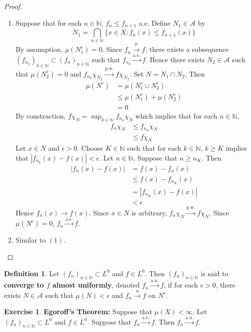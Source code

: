 \documentclass{book}
\theoremstyle{definition}
\newtheorem{defn}[definition]{Definition}
\newtheorem{ex}[definition]{Exercise}
\newcommand{\ep}{\epsilon}
\newcommand{\N}{\mathbb{N}}
\newcommand{\MA}{\mathcal{A}}
\newcommand{\lex}[1]{\label{ex:#1}}
\newcommand{\ld}[1]{\label{defn:#1}}
\DeclareMathOperator*{\0}{\mbf{0}}
\DeclareMathOperator*{\1}{\mbf{1}}
\newcommand{\convt}[1]{\xrightarrow{\text{#1}}}
\newcommand{\conv}[1]{\xrightarrow{#1}}
\begin{document}
	\begin{proof}\
		\begin{enumerate}
			\item Suppose that for each $n \in \N$, $f_n \leq f_{n+1}$ a.e. Define $N_1 \in \MA$ by 
			$$N_1 = \bigcap_{n \in \N} \{x \in X: f_n(x) \leq f_{n+1}(x)\}$$ 
			By assumption, $\mu(N_1^c) = 0$. Since $f_n \conv{\mu} f$, there exists a subsequence $(f_{n_k})_{k \in \N} \subset (f_n)_{n \in \N}$ such that $f_{n_k} \convt{a.e.} f$. Hence there exists $N_2 \in \MA$ such that $\mu(N_2^c) = 0$ and $f_{n_k} \chi_{N_2} \convt{p.w.} f \chi_{N_2}$. Set $N = N_1 \cap N_2$. Then 
			\begin{align*}
				\mu(N^c)
				& = \mu(N_1^c \cup N_2^c) \\
				& \leq \mu(N_1^c) + \mu(N_2^c) \\
				& = 0
			\end{align*}
			By construction, $f \chi_N = \sup_{k \in \N} f_{n_k} \chi_N$ which implies that for each $n \in \N$, 
			\begin{align*}
				f_n \chi_N
				& \leq f_{n_n} \chi_N \\ 
				& \leq f \chi_N
			\end{align*}
			Let $x \in N$ and $\ep > 0$. Choose $K \in \N$ such that for each $k \in \N$, $k \geq K$ implies that $|f_{n_k}(x) - f(x)| < \ep$. Let $n \in \N$. Suppose that $n \geq n_K$. Then 
			\begin{align*}
				|f_{n}(x) - f(x)|
				& = f(x) - f_{n}(x) \\
				& \leq f(x) - f_{n_K}(x) \\
				& = |f_{n_K}(x) - f(x)| \\
				& < \ep 
			\end{align*}
			Hence $f_n(x) \rightarrow f(x)$. Since $x \in N$ is arbitrary, $f_n \chi_N \convt{p.w.} f \chi_N$. Since $\mu(N^c) = 0$, $f_n \convt{a.e.} f$.
			\item Similar to $(1)$. 
		\end{enumerate}
	\end{proof}
	
	
	\begin{defn} \ld{35004} 
		 Let $(f_n)_{n \in \N} \subset L^0$ and $f \in L^0$. Then $(f_n)_{n \in \N}$ is said to \textbf{converge to $f$ almost uniformly}, denoted $f_n \xrightarrow{\text{a.u.}} f$, if for each $\ep >0$, there exists $N \in \MA$ such that $\mu(N) < \ep$ and $f_n \convt{u} f$ on $N^c$. 
	\end{defn}	
	
	\begin{ex} \lex{35005} \textbf{Egoroff's Theorem:}
		Suppose that $\mu(X) < \infty$. Let $(f_n)_{n \in \N} \subset L^0$ and $f \in L^0$. Suppose that $f_n \convt{a.e.} f$. Then $f_n \convt{a.u.} f$.
	\end{ex}
	
\end{document}
